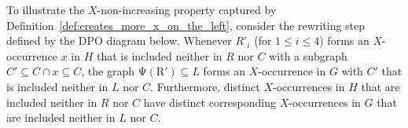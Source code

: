 \begin{example}
    To illustrate the $X$-non-increasing property captured by Definition~\ref{def:creates_more_x_on_the_left},
    consider the rewriting step defined by the DPO diagram below. Whenever \( R'_i \) (for \( 1 \leq i \leq 4 \)) forms an \( X \)-occurrence $x$ in $H$ that is included neither in \( R \) nor $C$ with a subgraph $C' \mathop{\subseteq} C \mathop{\cap} x \mathop{\subseteq} C$, the graph
    \( \operatorname{\Psi(R')} \mathop{\subseteq} L\) forms an \( X \)-occurrence in $G$ with $C'$ that is included neither in \( L \) nor $C$.
    Furthermore, distinct $X$-occurrences in $H$ that are included neither in \( R \) nor $C$ have distinct corresponding $X$-occurrences in $G$ that are included neither in \( L \) nor $C$.
    \begin{center} 
\end{center}
\end{example}
